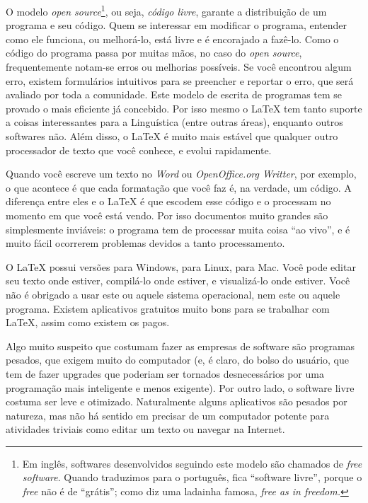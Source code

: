 O modelo \emph{open source}\footnote{Em inglês, softwares desenvolvidos seguindo este modelo são chamados de \emph{free software}. Quando traduzimos para o português, fica ``software livre'', porque o \emph{free} não é de ``grátis''; como diz uma ladainha famosa, \emph{free as in freedom.}}, ou seja, \emph{código livre}, garante a distribuição de um programa e seu código. Quem se interessar em modificar o programa, entender como ele funciona, ou melhorá-lo, está livre e é encorajado a fazê-lo. Como o código do programa passa por muitas mãos, no caso do \emph{open source}, frequentemente notam-se erros ou melhorias possíveis. Se você encontrou algum erro, existem formulários intuitivos para se preencher e reportar o erro, que será avaliado por toda a comunidade. Este modelo de escrita de programas tem se provado o mais eficiente já concebido. Por isso mesmo o \LaTeX{} tem tanto suporte a coisas interessantes para a Linguística (entre outras áreas), enquanto outros softwares não. Além disso, o \LaTeX{} é muito mais estável que qualquer outro processador de texto que você conhece, e evolui rapidamente.

Quando você escreve um texto no \emph{Word} ou \emph{OpenOffice.org Writter}, por exemplo, o que acontece é que cada formatação que você faz é, na verdade, um código. A diferença entre eles e o \LaTeX{} é que escodem esse código e o processam no momento em que você está vendo. Por isso documentos muito grandes são simplesmente inviáveis: o programa tem de processar muita coisa ``ao vivo'', e é muito fácil ocorrerem problemas devidos a tanto processamento.

O \LaTeX{} possui versões para Windows, para Linux, para Mac. Você pode editar seu texto onde estiver, compilá-lo onde estiver, e visualizá-lo onde estiver. Você não é obrigado a usar este ou aquele sistema operacional, nem este ou aquele programa. Existem aplicativos gratuitos muito bons para se trabalhar com \LaTeX{}, assim como existem os pagos.

Algo muito suspeito que costumam fazer as empresas de software são programas pesados, que exigem muito do computador (e, é claro, do bolso do usuário, que tem de fazer upgrades que poderiam ser tornados desnecessários por uma programação mais inteligente e menos exigente). Por outro lado, o software livre costuma ser leve e otimizado. Naturalmente alguns aplicativos são pesados por natureza, mas não há sentido em precisar de um computador potente para atividades triviais como editar um texto ou navegar na Internet. 
